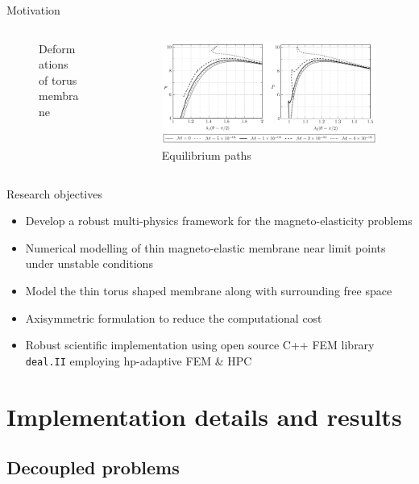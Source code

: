 \documentclass{beamer}
\begin{document}
\begin{frame}{Motivation}
\begin{columns}
\begin{column}{0.28\textwidth}
\begin{figure}
\caption{Deformations of torus membrane \cite{reddy_toroid}}
\end{figure}
\end{column}
\begin{column}{0.43\textwidth}
\begin{figure}
\centering
\includegraphics[width=0.98\textwidth]{saxena_load_disp.png}
\caption{Equilibrium paths \cite{reddy_toroid}}
\end{figure}
\end{column}
\end{columns}
\end{frame}

\begin{frame}{Research objectives}
\begin{itemize}
\item Develop a robust multi-physics framework for the magneto-elasticity problems
\item Numerical modelling of thin magneto-elastic membrane near limit points under unstable conditions
\item Model the thin torus shaped membrane along with surrounding free space
\item Axisymmetric formulation to reduce the computational cost
\item Robust scientific implementation using open source C++ FEM library \texttt{deal.II} \cite{dealII90} employing hp-adaptive FEM \& HPC
\end{itemize}
\end{frame}

\section{Implementation details and results}
\subsection{Decoupled problems}
\end{document}
